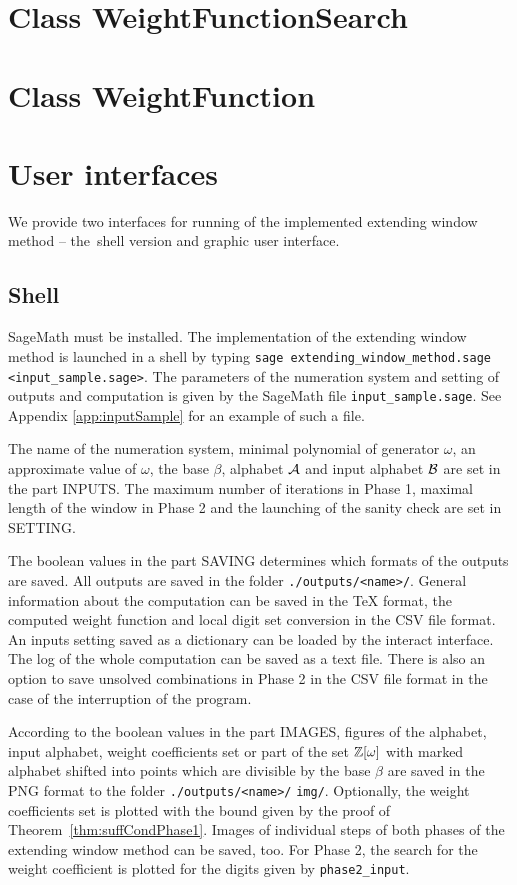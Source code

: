 \section{Class WeightFunctionSearch}



\section{Class WeightFunction}


\section{User interfaces}
We provide two interfaces for running of the implemented extending window method -- the~shell version and graphic user interface.

\subsection{Shell}
SageMath must be installed. The implementation of the extending window method is launched in a shell by typing \verb+sage extending_window_method.sage <input_sample.sage>+. The parameters of the numeration system and setting of outputs and computation is given by the SageMath file \verb+input_sample.sage+. See Appendix \ref{app:inputSample} for an example of such a file.

The name of the numeration system, minimal polynomial of generator $\omega$, an approximate value of $\omega$, the base $\beta$, alphabet $\mathcal{A}$ and input alphabet $\mathcal{B}$ are set in the part INPUTS. The maximum number of iterations in Phase 1, maximal length of the window in Phase 2 and the launching of the sanity check are set in SETTING. 

The boolean values in the part SAVING determines which formats of the outputs are saved. All outputs are saved in the folder \verb+./outputs/<name>/+. General information about the computation can be saved in the TeX format, the computed weight function and local digit set conversion in the CSV file format. An inputs setting saved as a dictionary can be loaded by the interact interface. The log of the whole computation can be saved as a text file. There is also an option to save unsolved combinations in Phase 2 in the CSV file format in the case of the interruption of the program.

According to the boolean values in the part IMAGES, figures of the alphabet, input alphabet, weight coefficients set or part of the set $\mathbb{Z}[\omega]$ with marked alphabet shifted into points which are divisible by the base $\beta$ are saved in the PNG format to the folder \verb+./outputs/<name>/+ \verb+img/+. Optionally, the weight coefficients set is plotted with the  bound given by the proof of Theorem~\ref{thm:suffCondPhase1}. Images of individual steps of both phases of the extending window method can be saved, too. For Phase 2, the search for the weight coefficient  is plotted for the digits given by \verb+phase2_input+.  

